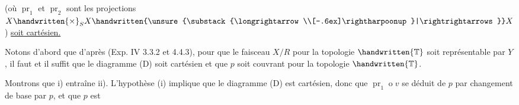 (où $\operatorname{pr}_1$ et $\operatorname{pr}_2$ sont les projections $X\handwritten{\times}_S X\handwritten{\unsure{\substack{\longrightarrow\\[-.6ex]\rightharpoonup}|\rightrightarrows}}X$) \uline{soit cartésien.}

Notons d'abord que d'après (Exp. IV 3.3.2 et 4.4.3), pour que le faisceau $X/R$  pour la topologie $\handwritten{\mathbb{T}}$ soit représentable par $Y$, il faut et il suffit que le diagramme (D) soit cartésien et que $p$ soit couvrant pour la topologie $\handwritten{\mathbb{T}}$.

Montrons que i) entraîne ii). L'hypothèse (i) implique que le diagramme (D) est cartésien, donc que $\operatorname{pr}_1\mathbin{o} v$ se déduit de $p$ par changement de base par $p$, et que $p$ est
